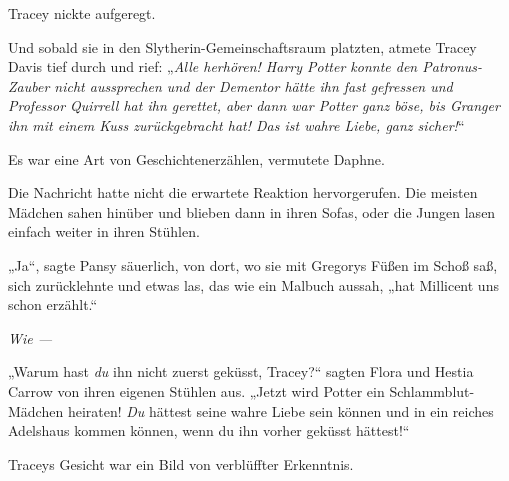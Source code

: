 Tracey nickte aufgeregt.

Und sobald sie in den Slytherin-Gemeinschaftsraum platzten, atmete Tracey Davis tief durch und rief:
„\emph{Alle herhören! Harry Potter konnte den Patronus-Zauber nicht aussprechen und der Dementor hätte ihn fast gefressen und Professor Quirrell hat ihn gerettet, aber dann war Potter ganz böse, bis Granger ihn mit einem Kuss zurückgebracht hat! Das ist wahre Liebe, ganz sicher!}“

Es war eine Art von Geschichtenerzählen, vermutete Daphne.

Die Nachricht hatte nicht die erwartete Reaktion hervorgerufen. Die meisten Mädchen sahen hinüber und blieben dann in ihren Sofas, oder die Jungen lasen einfach weiter in ihren Stühlen.

„Ja“, sagte Pansy säuerlich, von dort, wo sie mit Gregorys Füßen im Schoß saß, sich zurücklehnte und etwas las, das wie ein Malbuch aussah, „hat Millicent uns schon erzählt.“

\emph{Wie —}

„Warum hast \emph{du} ihn nicht zuerst geküsst, Tracey?“ sagten Flora und Hestia Carrow von ihren eigenen Stühlen aus.
„Jetzt wird Potter ein Schlammblut-Mädchen heiraten! \emph{Du} hättest seine wahre Liebe sein können und in ein reiches Adelshaus kommen können, wenn du ihn vorher geküsst hättest!“

Traceys Gesicht war ein Bild von verblüffter Erkenntnis.

